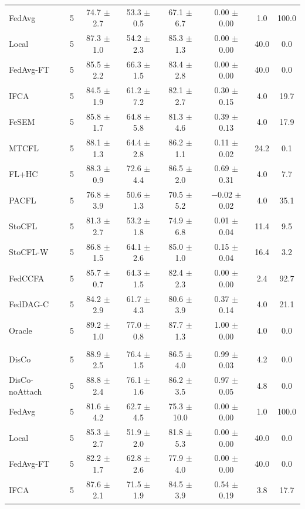 {\begin{tabular}{l r c c c c c c}
FedAvg & 5 & 74.7 $\pm$ 2.7 & 53.3 $\pm$ 0.5 & 67.1 $\pm$ 6.7 & 0.00 $\pm$ 0.00 & 1.0 & 100.0 \\
Local & 5 & 87.3 $\pm$ 1.0 & 54.2 $\pm$ 2.3 & 85.3 $\pm$ 1.3 & 0.00 $\pm$ 0.00 & 40.0 & 0.0 \\
FedAvg-FT & 5 & 85.5 $\pm$ 2.2 & 66.3 $\pm$ 1.5 & 83.4 $\pm$ 2.8 & 0.00 $\pm$ 0.00 & 40.0 & 0.0 \\
IFCA & 5 & 84.5 $\pm$ 1.9 & 61.2 $\pm$ 7.2 & 82.1 $\pm$ 2.7 & 0.30 $\pm$ 0.15 & 4.0 & 19.7 \\
FeSEM & 5 & 85.8 $\pm$ 1.7 & 64.8 $\pm$ 5.8 & 81.3 $\pm$ 4.6 & 0.39 $\pm$ 0.13 & 4.0 & 17.9 \\
MTCFL & 5 & 88.1 $\pm$ 1.3 & 64.4 $\pm$ 2.8 & 86.2 $\pm$ 1.1 & 0.11 $\pm$ 0.02 & 24.2 & 0.1 \\
FL+HC & 5 & 88.3 $\pm$ 0.9 & 72.6 $\pm$ 4.4 & 86.5 $\pm$ 2.0 & 0.69 $\pm$ 0.31 & 4.0 & 7.7 \\
PACFL & 5 & 76.8 $\pm$ 3.9 & 50.6 $\pm$ 1.3 & 70.5 $\pm$ 5.2 & $-$0.02 $\pm$ 0.02 & 4.0 & 35.1 \\
StoCFL & 5 & 81.3 $\pm$ 2.7 & 53.2 $\pm$ 1.8 & 74.9 $\pm$ 6.8 & 0.01 $\pm$ 0.04 & 11.4 & 9.5 \\
StoCFL-W & 5 & 86.8 $\pm$ 1.5 & 64.1 $\pm$ 2.6 & 85.0 $\pm$ 1.0 & 0.15 $\pm$ 0.04 & 16.4 & 3.2 \\
FedCCFA & 5 & 85.7 $\pm$ 0.7 & 64.3 $\pm$ 1.5 & 82.4 $\pm$ 2.3 & 0.00 $\pm$ 0.00 & 2.4 & 92.7 \\
FedDAG-C & 5 & 84.2 $\pm$ 2.9 & 61.7 $\pm$ 4.3 & 80.6 $\pm$ 3.9 & 0.37 $\pm$ 0.14 & 4.0 & 21.1 \\
Oracle & 5 & 89.2 $\pm$ 1.0 & 77.0 $\pm$ 0.8 & 87.7 $\pm$ 1.3 & 1.00 $\pm$ 0.00 & 4.0 & 0.0 \\
\addlinespace
\multicolumn{8}{l}{\textit{Rotation + QS}} \\
DisCo & 5 & 88.9 $\pm$ 2.5 & 76.4 $\pm$ 1.5 & 86.5 $\pm$ 4.0 & 0.99 $\pm$ 0.03 & 4.2 & 0.0 \\
DisCo-noAttach & 5 & 88.8 $\pm$ 2.4 & 76.1 $\pm$ 1.6 & 86.2 $\pm$ 3.5 & 0.97 $\pm$ 0.05 & 4.8 & 0.0 \\
FedAvg & 5 & 81.6 $\pm$ 4.2 & 62.7 $\pm$ 4.5 & 75.3 $\pm$ 10.0 & 0.00 $\pm$ 0.00 & 1.0 & 100.0 \\
Local & 5 & 85.3 $\pm$ 2.7 & 51.9 $\pm$ 2.0 & 81.8 $\pm$ 5.3 & 0.00 $\pm$ 0.00 & 40.0 & 0.0 \\
FedAvg-FT & 5 & 82.2 $\pm$ 1.7 & 62.8 $\pm$ 2.6 & 77.9 $\pm$ 4.0 & 0.00 $\pm$ 0.00 & 40.0 & 0.0 \\
IFCA & 5 & 87.6 $\pm$ 2.1 & 71.5 $\pm$ 1.9 & 84.5 $\pm$ 3.9 & 0.54 $\pm$ 0.19 & 3.8 & 17.7 \\

\end{tabular}}
